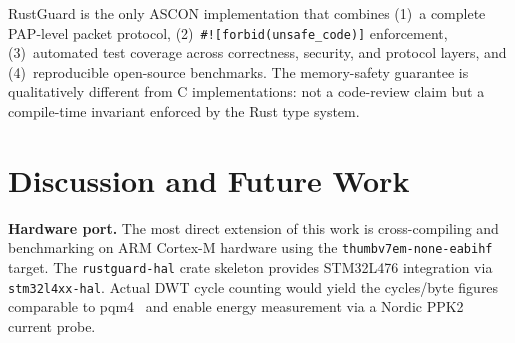 \documentclass[conference]{IEEEtran}
\begin{document}
\begin{table}[!ht]
\centering
\caption{Comparison of ASCON-128 Software Implementations}
\label{tab:comparison}
\renewcommand{\arraystretch}{1.2}
\footnotesize
{}
\end{table}

RustGuard is the only ASCON implementation that combines (1)~a complete
PAP-level packet protocol, (2)~\texttt{\#![forbid(unsafe\_code)]} enforcement,
(3)~automated test coverage across correctness, security, and protocol layers,
and (4)~reproducible open-source benchmarks. The memory-safety guarantee is
qualitatively different from C implementations: not a code-review claim but a
compile-time invariant enforced by the Rust type system.

\section{Discussion and Future Work}
\label{sec:discussion}

\textbf{Hardware port.}
The most direct extension of this work is cross-compiling and benchmarking on
ARM Cortex-M hardware using the \texttt{thumbv7em-none-eabihf} target.
The \texttt{rustguard-hal} crate skeleton provides STM32L476 integration via
\texttt{stm32l4xx-hal}. Actual DWT cycle counting would yield the cycles/byte
figures comparable to pqm4~\cite{b10} and enable energy measurement via a
Nordic PPK2 current probe.
\end{document}
